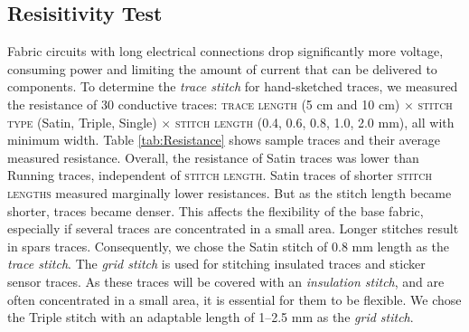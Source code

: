 \documentclass[header.tex]{subfiles}
\begin{document}




 \subsection{Resisitivity Test} 
 Fabric circuits with long electrical connections drop significantly more voltage, consuming power and limiting the amount of current that can be delivered to components. To determine the \textit{trace stitch} for hand-sketched traces, we measured the resistance of 30 conductive traces: \textsc{trace length} (5 cm and 10 cm) $\times$ \textsc{stitch type} (Satin, Triple, Single) $\times$ \textsc{stitch length} (0.4, 0.6, 0.8, 1.0, 2.0 mm), all with minimum width. Table \ref{tab:Resistance} shows sample traces and their average measured resistance. Overall, the resistance of Satin traces was lower than Running traces, independent of \textsc{stitch length}. Satin traces of shorter \textsc{stitch lengths} measured marginally lower resistances. But as the stitch length became shorter, traces became denser. This affects the flexibility of the base fabric, especially if several traces are concentrated in a small area. Longer stitches result in spars traces. Consequently, we chose the Satin stitch of 0.8 mm length as the \textit{trace stitch}.  The \textit{grid stitch} is used for stitching insulated traces and sticker sensor traces. As these traces will be covered with an \textit{insulation stitch}, and are often concentrated in a small area, it is essential for them to be flexible. We chose the Triple stitch with an adaptable length of 1--2.5 mm as the \textit{grid stitch}.
\end{document}
